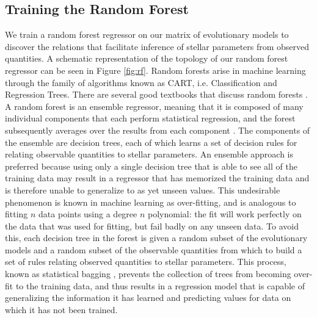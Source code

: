 \documentclass[manuscript,linenumbers]{aastex6}
\newif\ifref
\newcommand{\mb}[1]{\ifref\boldmath\textbf{#1}\unboldmath\else #1\fi}
\begin{document}
\subsection{Training the Random Forest} \label{sec:forest}
We train a random forest regressor on our matrix of evolutionary models to discover the relations that facilitate inference of stellar parameters from \mb{observed} quantities. A schematic representation of the topology of our random forest regressor can be seen in Figure \ref{fig:rf}. \mb{Random forests arise in machine learning through the family of algorithms known as CART, i.e. Classification and Regression Trees.} There are several good textbooks that discuss random forests \citep[see e.g.][Chapter 15]{hastie2005elements}. \mb{A random forest is an ensemble regressor, meaning that it is composed of many individual components that each perform statistical regression, and the forest subsequently averages over the results from each component \citep{breiman2001random}. The components of the ensemble are decision trees, each of which learns a set of decision rules for relating \mb{observable quantities} to \mb{stellar parameters}. An ensemble approach is preferred because using only a single decision tree that is able to see all of the training data may result in a regressor that has memorized the training data and is therefore unable to generalize to as yet unseen values. This undesirable phenomenon is known in machine learning as over-fitting, and is analogous to fitting $n$ data points using a degree $n$ polynomial: the fit will work perfectly on the data that was used for fitting, but fail badly on any unseen data. To avoid this, each decision tree in the forest is given a random subset of the evolutionary models and a random subset of the observable quantities from which to build a set of rules relating observed quantities to stellar parameters. This process, known as statistical bagging \citep[][Section 8.7]{hastie2005elements}, prevents the collection of trees from becoming over-fit to the training data, and thus results in a regression model that is capable of generalizing the information it has learned and predicting values for data on which it has not been trained. } 
\end{document}
